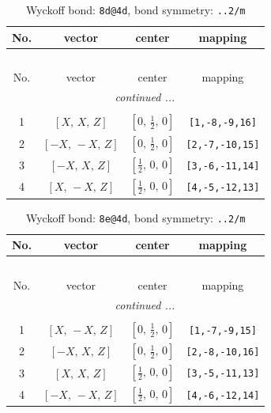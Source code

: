 \documentclass[fleqn,8pt]{jsarticle}
\begin{document}
\begin{longtable}{cccc}
\caption{Wyckoff bond: {\tt 8d@4d}, bond symmetry: {\tt ..2/m}}
 \\
 \hline \hline
No. & vector & center & mapping \\ \hline \endfirsthead

\multicolumn{3}{l}{\tablename\ \thetable{}} \\
 \hline \hline
No. & vector & center & mapping \\ \hline \endhead

 \hline \hline
\multicolumn{3}{r}{\footnotesize\it continued ...} \\ \endfoot

 \hline \hline
\multicolumn{3}{r}{} \\ \endlastfoot

1 & $\left[ X,\, X,\, Z \right]$ & $\left[ 0,\, \frac{1}{2},\, 0 \right]$ & {\tt [1,-8,-9,16]} \\ \hline
2 & $\left[ - X,\, - X,\, Z \right]$ & $\left[ 0,\, \frac{1}{2},\, 0 \right]$ & {\tt [2,-7,-10,15]} \\ \hline
3 & $\left[ - X,\, X,\, Z \right]$ & $\left[ \frac{1}{2},\, 0,\, 0 \right]$ & {\tt [3,-6,-11,14]} \\ \hline
4 & $\left[ X,\, - X,\, Z \right]$ & $\left[ \frac{1}{2},\, 0,\, 0 \right]$ & {\tt [4,-5,-12,13]} \\
\end{longtable}
\renewcommand{\arraystretch}{1.2}
\begin{longtable}{cccc}
\caption{Wyckoff bond: {\tt 8e@4d}, bond symmetry: {\tt ..2/m}}
 \\
 \hline \hline
No. & vector & center & mapping \\ \hline \endfirsthead

\multicolumn{3}{l}{\tablename\ \thetable{}} \\
 \hline \hline
No. & vector & center & mapping \\ \hline \endhead

 \hline \hline
\multicolumn{3}{r}{\footnotesize\it continued ...} \\ \endfoot

 \hline \hline
\multicolumn{3}{r}{} \\ \endlastfoot

1 & $\left[ X,\, - X,\, Z \right]$ & $\left[ 0,\, \frac{1}{2},\, 0 \right]$ & {\tt [1,-7,-9,15]} \\ \hline
2 & $\left[ - X,\, X,\, Z \right]$ & $\left[ 0,\, \frac{1}{2},\, 0 \right]$ & {\tt [2,-8,-10,16]} \\ \hline
3 & $\left[ X,\, X,\, Z \right]$ & $\left[ \frac{1}{2},\, 0,\, 0 \right]$ & {\tt [3,-5,-11,13]} \\ \hline
4 & $\left[ - X,\, - X,\, Z \right]$ & $\left[ \frac{1}{2},\, 0,\, 0 \right]$ & {\tt [4,-6,-12,14]} \\
\end{longtable}
\end{document}
